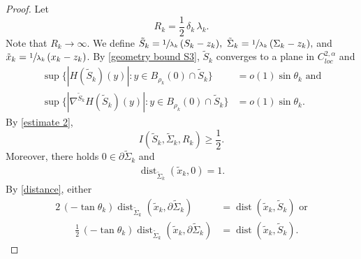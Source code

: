 \documentclass[11pt]{amsart}
\begin{document}
\begin{proof}
Let $$R_k=\frac12\,\delta_k\,\lambda_k.$$ Note that $R_k\to\infty$. We define $\tilde S_k=\sfrac{1}{\lambda_k}\,(S_k-z_k),$ $\tilde \Sigma_k=\sfrac{1}{\lambda_k}\,(\Sigma_k-z_k),$ and $\tilde x_k=\sfrac{1}{\lambda_k}\,(x_k-z_k)$. 	By \eqref{geometry bound S3}, $\tilde S_k$ converges  to a plane in $C_{loc}^{2,\alpha}$ and 
	\begin{align*} 
\sup\{|H(\tilde S_k)(y)|:y\in B_{\rho_k}(0)\cap \tilde S_k\}&=o(1)\sin\theta_k\text{ and}\\
\sup\{|\nabla^{\tilde S_k}H(\tilde S_k)(y)|:y\in B_{\rho_k}(0)\cap \tilde S_k\}&=o(1)\sin\theta_k.
\end{align*}
 By \eqref{estimate 2},  
$$
I(\tilde S_k,\tilde \Sigma_k,R_k)\geq\frac12.
$$
Moreover, there holds $0\in \partial \tilde \Sigma_k$ and
\begin{align} \label{distance 1} \operatorname{dist}_{\tilde \Sigma_k}(\tilde x_k,0)=1. 
	\end{align} By \eqref{distance}, either
	\begin{equation} \label{distance 2} 
		\begin{aligned} 
			2\,(-\tan\theta_k)\operatorname{dist}_{\tilde \Sigma_k}(\tilde x_k, \partial {\tilde \Sigma_k})&=\operatorname{dist}(\tilde x_k,\tilde S_k)\text{ or}\\
			\qquad \frac12\,(-\tan\theta_k)\operatorname{dist}_{\tilde \Sigma_k}(\tilde x_k, \partial {\tilde \Sigma_k})&=\operatorname{dist}(\tilde x_k,\tilde S_k).
		\end{aligned} 
	\end{equation} 


\end{proof}
\end{document}
